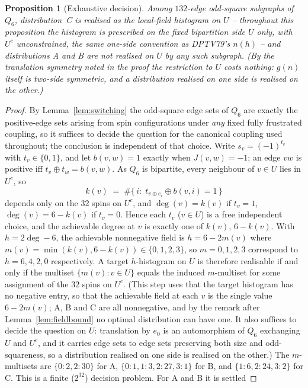 \documentclass[12pt,a4paper]{article}
\newtheorem{proposition}[theorem]{Proposition}
\theoremstyle{definition}
\begin{document}
\begin{proposition}[Exhaustive decision]\label{prop:q6realizability}
Among $132$-edge odd-square subgraphs of $Q_6$, distribution~C is realised as
the local-field histogram on $U$ -- throughout this proposition the histogram
is prescribed on the fixed bipartition side $U$ \emph{only}, with $U^{c}$
unconstrained, the same one-side convention as DPTV79's $n(h)$ -- and
distributions A and B are not realised on $U$ by any such subgraph. (By the
translation symmetry noted in the proof the restriction to $U$ costs nothing:
$g(n)$ itself is two-side symmetric, and a distribution realised on one side
is realised on the other.)
\end{proposition}
\begin{proof}
By Lemma~\ref{lem:switching} the odd-square edge sets of $Q_6$ are exactly the
positive-edge sets arising from spin configurations under \emph{any} fixed fully
frustrated coupling, so it suffices to decide the question for the canonical
coupling used throughout; the conclusion is independent of that choice.
Write $s_v=(-1)^{t_v}$ with $t_v\in\{0,1\}$, and let $b(v,w)=1$ exactly when
$J(v,w)=-1$; an edge $vw$ is positive iff $t_v\oplus t_w=b(v,w)$. As $Q_6$ is
bipartite, every neighbour of $v\in U$ lies in $U^{c}$, so
\[
k(v)\;=\;\#\{\,i:\;t_{v\oplus e_i}\oplus b(v,i)=1\,\}
\]
depends only on the $32$ spins on $U^{c}$, and
$\deg(v)=k(v)$ if $t_v=1$, $\deg(v)=6-k(v)$ if $t_v=0$. Hence each $t_v$
($v\in U$) is a free independent choice, and the achievable degree at $v$ is
exactly one of $k(v)$, $6-k(v)$. With $h=2\deg-6$, the achievable nonnegative
field is $h=6-2m(v)$ where $m(v)=\min(k(v),6-k(v))\in\{0,1,2,3\}$, so
$m=0,1,2,3$ correspond to $h=6,4,2,0$ respectively. A target $h$-histogram on
$U$ is therefore realisable if and only if the multiset $\{m(v):v\in U\}$ equals
the induced $m$-multiset for some assignment of the $32$ spins on $U^{c}$.
(This step uses that the target histogram has no negative entry, so that the
achievable field at each $v$ is the single value $6-2m(v)$; A, B and C are all
nonnegative, and by the remark after Lemma~\ref{lem:fieldbound} no optimal
distribution can have one. It also suffices to decide the question on $U$: translation by $e_0$ is an
automorphism of $Q_6$ exchanging $U$ and $U^{c}$, and it carries edge sets to
edge sets preserving both size and odd-squareness, so a distribution realised
on one side is realised on the other.) The
$m$-multisets are $\{0{:}2,2{:}30\}$ for A, $\{0{:}1,1{:}3,2{:}27,3{:}1\}$ for
B, and $\{1{:}6,2{:}24,3{:}2\}$ for C. This is a finite ($2^{32}$) decision problem. For A and B it is settled

\end{proof}
\end{document}
